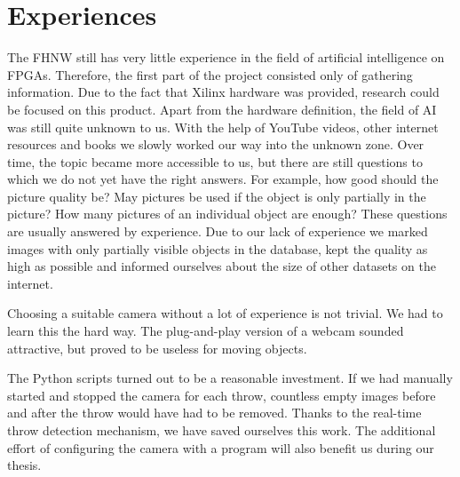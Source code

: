 \section{Experiences}
\label{sec:experiences}

The FHNW still has very little experience in the field of artificial intelligence on FPGAs.
Therefore, the first part of the project consisted only of gathering information.
Due to the fact that Xilinx hardware was provided, research could be focused on this product.
Apart from the hardware definition, the field of AI was still quite unknown to us.
With the help of YouTube videos, other internet resources and books we slowly worked our way into the unknown zone. 
Over time, the topic became more accessible to us, but there are still questions to which we do not yet have the right answers.
For example, how good should the picture quality be?
May pictures be used if the object is only partially in the picture?
How many pictures of an individual object are enough?
These questions are usually answered by experience.
Due to our lack of experience we marked images with only partially visible objects in the database, kept the quality as high as possible and informed ourselves about the size of other datasets on the internet.

Choosing a suitable camera without a lot of experience is not trivial.
We had to learn this the hard way.
The plug-and-play version of a webcam sounded attractive, but proved to be useless for moving objects.

The Python scripts turned out to be a reasonable investment.
If we had manually started and stopped the camera for each throw, countless empty images before and after the throw would have had to be removed.
Thanks to the real-time throw detection mechanism, we have saved ourselves this work.
The additional effort of configuring the camera with a program will also benefit us during our thesis.


